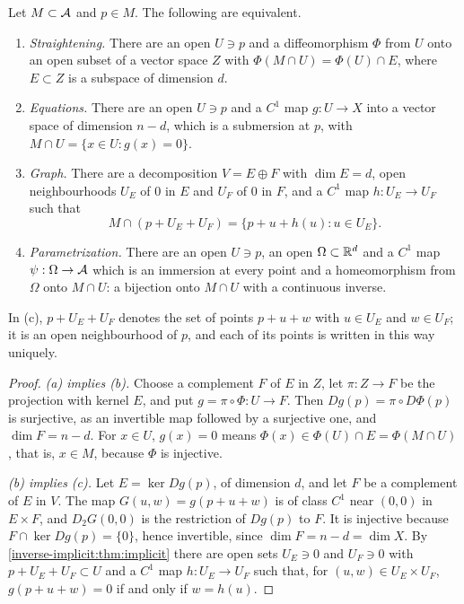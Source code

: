 \begin{notechapter}
\begin{theorem}\label{submanifolds:thm:four}
Let $M\subset\mathcal{A}$ and $p\in M$. The following are equivalent.
\begin{enumerate}[nosep,label=(\alph*)]
  \item \emph{Straightening.} There are an open $U\ni p$ and a
        diffeomorphism $\Phi$ from $U$ onto an open subset of a vector
        space $Z$ with $\Phi(M\cap U) = \Phi(U)\cap E$, where $E\subset Z$
        is a subspace of dimension $d$.
  \item \emph{Equations.} There are an open $U\ni p$ and a $C^1$ map
        $g:U\to X$ into a vector space of dimension $n - d$, which is a
        submersion at $p$, with $M\cap U = \{x\in U : g(x) = 0\}$.
  \item \emph{Graph.} There are a decomposition $V = E\oplus F$ with
        $\dim E = d$, open neighbourhoods $U_E$ of $0$ in $E$ and $U_F$
        of $0$ in $F$, and a $C^1$ map $h:U_E\to U_F$ such that
        \[
          M\cap(p + U_E + U_F) = \{p + u + h(u) : u\in U_E\} .
        \]
  \item \emph{Parametrization.} There are an open $U\ni p$, an open
        $\Omega\subset\mathbb{R}^d$ and a $C^1$ map $\psi:\Omega\to\mathcal{A}$ which is
        an immersion at every point and a homeomorphism from $\Omega$
        onto $M\cap U$: a bijection onto $M\cap U$ with a continuous
        inverse.
\end{enumerate}
\end{theorem}

In (c), $p + U_E + U_F$ denotes the set of points $p + u + w$ with
$u\in U_E$ and $w\in U_F$; it is an open neighbourhood of $p$, and each of
its points is written in this way uniquely.

\begin{proof}
\emph{(a) implies (b).} Choose a complement $F$ of $E$ in $Z$, let
$\pi:Z\to F$ be the projection with kernel $E$, and put
$g = \pi\circ\Phi:U\to F$. Then $Dg(p) = \pi\circ D\Phi(p)$ is surjective,
as an invertible map followed by a surjective one, and $\dim F = n - d$.
For $x\in U$, $g(x) = 0$ means $\Phi(x)\in\Phi(U)\cap E = \Phi(M\cap U)$,
that is, $x\in M$, because $\Phi$ is injective.

\emph{(b) implies (c).} Let $E = \ker Dg(p)$, of dimension $d$, and let
$F$ be a complement of $E$ in $V$. The map $G(u, w) = g(p + u + w)$ is of
class $C^1$ near $(0, 0)$ in $E\times F$, and $D_2G(0, 0)$ is the
restriction of $Dg(p)$ to $F$. It is injective because
$F\cap\ker Dg(p) = \{0\}$, hence invertible, since
$\dim F = n - d = \dim X$. By \cref{inverse-implicit:thm:implicit} there
are open sets $U_E\ni0$ and $U_F\ni0$ with $p + U_E + U_F\subset U$ and a
$C^1$ map $h:U_E\to U_F$ such that, for $(u, w)\in U_E\times U_F$,
$g(p + u + w) = 0$ if and only if $w = h(u)$.


\end{proof}
\end{notechapter}
